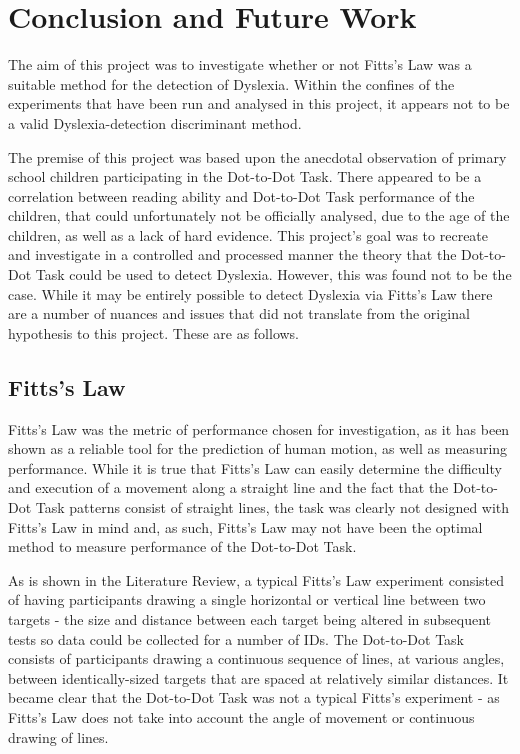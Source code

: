\section{Conclusion and Future Work}
	The aim of this project was to investigate whether or not Fitts’s Law was a suitable method for the detection of Dyslexia. Within the confines of the experiments that have been run and analysed in this project, it appears not to be a valid Dyslexia-detection discriminant method.
	
	The premise of this project was based upon the anecdotal observation of primary school children participating in the Dot-to-Dot Task. There appeared to be a correlation between reading ability and Dot-to-Dot Task performance of the children, that could unfortunately not be officially analysed, due to the age of the children, as well as a lack of hard evidence. This project’s goal was to recreate and investigate in a controlled and processed manner the theory that the Dot-to-Dot Task could be used to detect Dyslexia. However, this was found not to be the case.
	While it may be entirely possible to detect Dyslexia via Fitts’s Law there are a number of nuances and issues that did not translate from the original hypothesis to this project. These are as follows.
	
	\subsection{Fitts’s Law}
		Fitts’s Law was the metric of performance chosen for investigation, as it has been shown as a reliable tool for the prediction of human motion, as well as measuring performance. While it is true that Fitts’s Law can easily determine the difficulty and execution of a movement along a straight line and the fact that the Dot-to-Dot Task patterns consist of straight lines, the task was clearly not designed with Fitts’s Law in mind and, as such, Fitts’s Law may not have been the optimal method to measure performance of the Dot-to-Dot Task. 
		
		As is shown in the Literature Review, a typical Fitts’s Law experiment consisted of having participants drawing a single horizontal or vertical line between two targets - the size and distance between each target being altered in subsequent tests so data could be collected for a number of IDs. The Dot-to-Dot Task consists of participants drawing a continuous sequence of lines, at various angles, between identically-sized targets that are spaced at relatively similar distances. It became clear that the Dot-to-Dot Task was not a typical Fitts’s experiment - as Fitts’s Law does not take into account the angle of movement or continuous drawing of lines.
	
